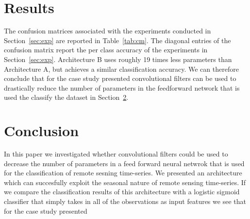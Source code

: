 \documentclass{article}
\begin{document}
\section{Results}
\label{sec:results}
The confusion matrices associated with the experiments conducted in Section~\ref{sec:exp} are reported in Table~\ref{tab:cm}. The diagonal entries of the confusion matrix report the per class accuracy of the experiments in Section~\ref{sec:exp}. Architecture B uses roughly 19 times less parameters than Architecture A, but achieves a similar classification accuracy. We can therefore conclude that for the case study presented  convolutional filters can be used to drastically reduce the number of parameters in the feedforward network that is used the classify the dataset in Section~\ref{}. 

\section{Conclusion}
In this paper we investigated whether convolutional filters could be used to decrease the number of parameters in a feed forward neural netwrok that is used for the classification of remote sesning time-series. We presented an architecture which can succesfully exploit the seasonal nature of remote sensing time-series. If we compare the classification results of this architecture with a logistic sigmoid classifier that simply takes in all of the observations as input features we see that for the case study presented  
\end{document}
